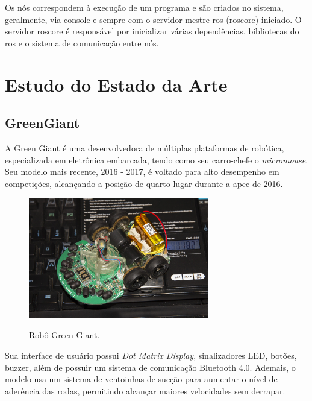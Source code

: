 Os nós correspondem à execução de um programa e são criados no sistema, geralmente, via console e sempre com o servidor mestre \gls*{ros} (roscore) iniciado. O servidor roscore é responsável por inicializar várias dependências, bibliotecas do \gls*{ros} e o sistema de comunicação entre nós.
\section{Estudo do Estado da Arte}
\label{sec:sota}

\subsection{GreenGiant}
\hspace{0.5cm} A Green Giant é uma desenvolvedora de múltiplas plataformas de robótica, especializada em eletrônica embarcada, tendo como seu carro-chefe o \textit{micromouse}. Seu modelo mais recente, 2016 - 2017, é voltado para alto desempenho em competições, alcançando a posição de quarto lugar durante a \gls*{apec} de 2016.

\begin{figure}[H]
	\centering
	\caption{Robô Green Giant.}
	\includegraphics[width=0.7\textwidth]
	{Figures/GreenGiant_model.jpg}
	\label{fig:Green_Giant_model}
	\end{figure}

\hspace{0.5cm}Sua interface de usuário possui \textit{Dot Matrix Display}, sinalizadores LED, botões, buzzer, além de possuir um sistema de comunicação Bluetooth 4.0. Ademais, o modelo usa um sistema de ventoinhas de sucção para aumentar o nível de aderência das rodas, permitindo alcançar maiores velocidades sem derrapar.

